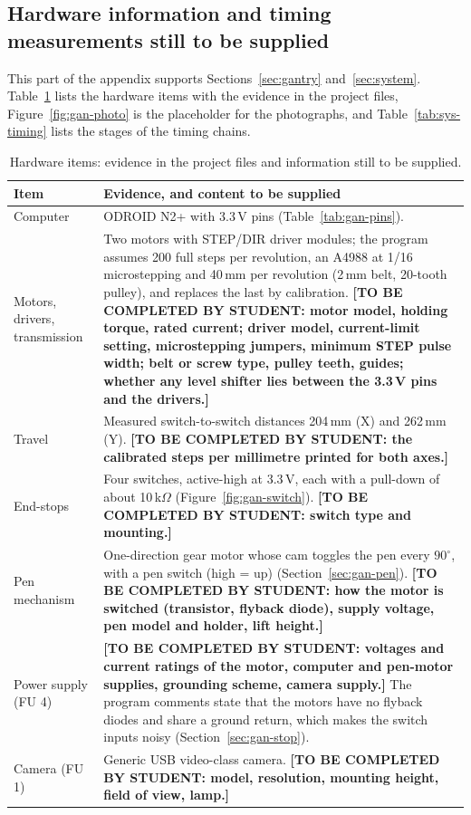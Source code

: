 \subsection{Hardware information and timing measurements still to be supplied}

This part of the appendix supports Sections~\ref{sec:gantry} and~\ref{sec:system}.
Table~\ref{tab:gan-hw} lists the hardware items with the evidence in the project files, Figure~\ref{fig:gan-photo} is the placeholder for the photographs, and Table~\ref{tab:sys-timing} lists the stages of the timing chains.

\begin{table}[!htbp]
\centering
\fontsize{9.5}{11.5}\selectfont
\begin{tabularx}{\linewidth}{|p{2.6cm}|X|}
\hline
\textbf{Item} & \textbf{Evidence, and content to be supplied} \\
\hline
Computer & ODROID N2+ with 3.3\,V pins (Table~\ref{tab:gan-pins}). \\
\hline
Motors, drivers, transmission & Two motors with STEP/DIR driver modules; the program assumes 200 full steps per revolution, an A4988 at 1/16 microstepping and 40\,mm per revolution (2\,mm belt, 20-tooth pulley), and replaces the last by calibration. \textbf{[TO BE COMPLETED BY STUDENT: motor model, holding torque, rated current; driver model, current-limit setting, microstepping jumpers, minimum STEP pulse width; belt or screw type, pulley teeth, guides; whether any level shifter lies between the 3.3\,V pins and the drivers.]} \\
\hline
Travel & Measured switch-to-switch distances 204\,mm (X) and 262\,mm (Y). \textbf{[TO BE COMPLETED BY STUDENT: the calibrated steps per millimetre printed for both axes.]} \\
\hline
End-stops & Four switches, active-high at 3.3\,V, each with a pull-down of about 10\,k$\Omega$ (Figure~\ref{fig:gan-switch}). \textbf{[TO BE COMPLETED BY STUDENT: switch type and mounting.]} \\
\hline
Pen mechanism & One-direction gear motor whose cam toggles the pen every $90^\circ$, with a pen switch (high = up) (Section~\ref{sec:gan-pen}). \textbf{[TO BE COMPLETED BY STUDENT: how the motor is switched (transistor, flyback diode), supply voltage, pen model and holder, lift height.]} \\
\hline
Power supply (FU 4) & \textbf{[TO BE COMPLETED BY STUDENT: voltages and current ratings of the motor, computer and pen-motor supplies, grounding scheme, camera supply.]} The program comments state that the motors have no flyback diodes and share a ground return, which makes the switch inputs noisy (Section~\ref{sec:gan-stop}). \\
\hline
Camera (FU 1) & Generic USB video-class camera. \textbf{[TO BE COMPLETED BY STUDENT: model, resolution, mounting height, field of view, lamp.]} \\
\hline
\end{tabularx}
\caption{Hardware items: evidence in the project files and information still to be supplied.}
\label{tab:gan-hw}
\end{table}

